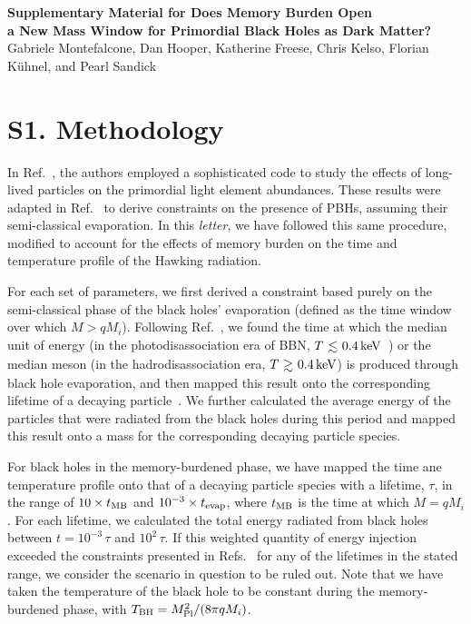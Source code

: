 \clearpage
\onecolumngrid

\setcounter{figure}{0}
\renewcommand{\thefigure}{S\arabic{figure}}
\setcounter{section}{0}
\renewcommand{\thesection}{S\arabic{section}}
\begin{center}
  \textbf{\large Supplementary Material for Does Memory Burden Open\\ a New Mass Window for Primordial Black Holes as Dark Matter?}\\[.2cm]
  \vspace{0.05in}
  {Gabriele Montefalcone, Dan Hooper, Katherine Freese, Chris Kelso, Florian K{\"u}hnel, and Pearl Sandick}
\end{center}


\section{S1. Methodology}\label{sec:s1}
In Ref.~\cite{Kawasaki:2017bqm}, the authors employed a sophisticated code to study the effects of long-lived particles on the primordial light element abundances. These results were adapted in Ref.~\cite{Keith:2020jww} to derive constraints on the presence of PBHs, assuming their semi-classical evaporation.  In this \textit{letter}, we have followed this same procedure, modified to account for the effects of memory burden on the time and temperature profile of the Hawking radiation. 

For each set of parameters, we first derived a constraint based purely on the semi-classical phase of the black holes' evaporation (defined as the time window over which $M > q M_{i}$). Following Ref.~\cite{Keith:2020jww}, we found the time at which the median unit of energy (in the photodisassociation era of BBN, $T \lsim 0.4\,{\rm keV}$~\cite{Kawasaki:1994af}) or the median meson (in the hadrodisassociation era, $T \gsim 0.4\,{\rm keV}$) is produced through black hole evaporation, and then mapped this result onto the corresponding lifetime of a decaying particle~\cite{Kawasaki:1994af}. We further calculated the average energy of the particles that were radiated from the black holes during this period and mapped this result onto a mass for the corresponding decaying particle species. 

For black holes in the memory-burdened phase, we have mapped the time ane temperature profile onto that of a decaying particle species with a lifetime, $\tau$, in the range of $10 \times t_{\rm MB}$ and $10^{-3} \times t_{\rm evap}$, where $t_{\rm MB}$ is the time at which $M=q M_{i}$. For each lifetime, we calculated the total energy radiated from black holes between $t= 10^{-3}\,\tau$ and $10^{2}\,\tau$. If this weighted quantity of energy injection exceeded the constraints presented in Refs.~\cite{Keith:2020jww, Kawasaki:2017bqm} for any of the lifetimes in the stated range, we consider the scenario in question to be ruled out. Note that we have taken the temperature of the black hole to be constant during the memory-burdened phase, with $T_{\rm BH} = M^{2}_{\rm Pl}/(8 \pi q M_{i})$.

